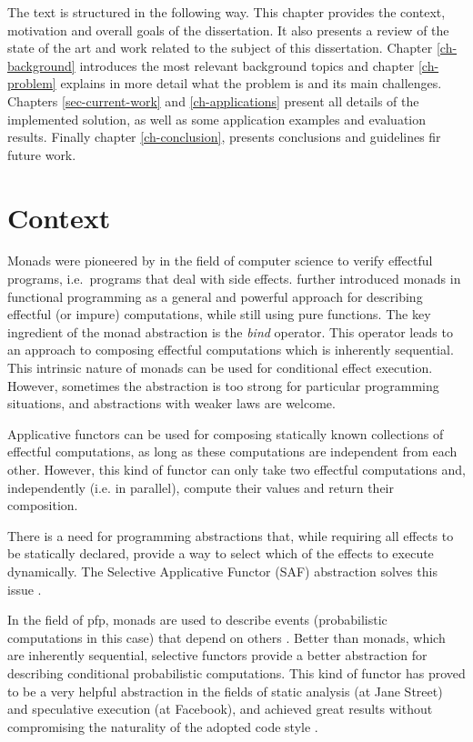 \documentclass[
  oneside,
  11pt, a4paper,
  footinclude=true,
  headinclude=true,
  cleardoublepage=empty
]{scrbook}
\theoremstyle{definition}
\theoremstyle{definition}
\begin{document}
        The text is structured in the following way. This chapter provides the context, motivation and overall goals of the dissertation. It also presents a review of the state of the art and work related to the subject of this dissertation. Chapter \ref{ch-background} introduces the most relevant background topics and chapter \ref{ch-problem} explains in more detail what the problem is and its main challenges. Chapters \ref{sec-current-work} and \ref{ch-applications} present all details of the implemented solution, as well as some application examples and evaluation results. Finally chapter \ref{ch-conclusion}, presents conclusions and guidelines fir future work.
		
    \section{Context}\label{sec-context}
    
    Monads were pioneered by \cite{Moggi:1991:NCM:116981.116984} in the field of computer science to verify effectful programs, i.e.\ programs that deal with side effects. \cite{Wadler:1989:TF:99370.99404} further introduced monads in functional programming as a general and powerful approach for describing effectful (or impure) computations, while still using pure functions. The key ingredient of the monad abstraction is the \textit{bind} operator. This operator leads to an approach to composing effectful computations which is inherently sequential. This intrinsic nature of monads can be used for conditional effect execution. However, sometimes the abstraction is too strong for particular programming situations, and abstractions with weaker laws are welcome.

    Applicative functors \citep{mcbride2008applicative} can be used for composing statically known collections of effectful computations, as long as these computations are independent from each other. However, this kind of functor can only take two effectful computations and, independently (i.e. in parallel), compute their values and return their composition.

   There is a need for programming abstractions that, while requiring all effects to be statically declared, provide a way to select which of the effects to execute dynamically. The Selective Applicative Functor (SAF) abstraction solves this issue \citep{andrey2019selective}.

    In the field of \gls{pfp}, monads are used to describe events (probabilistic computations in this case) that depend on others \citep{erwig_kollmansberger_2006}. Better than monads, which are inherently sequential, selective functors provide a better abstraction for describing conditional probabilistic computations. This kind of functor has proved to be a very helpful abstraction in the fields of static analysis (at Jane Street) and speculative execution (at Facebook), and achieved great results without compromising the naturality of the adopted code style \citep{andrey2019selective}.
    
\end{document}

